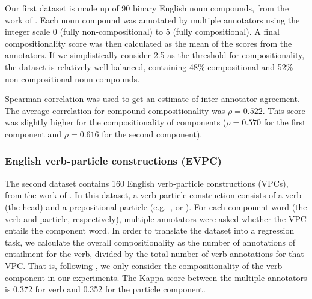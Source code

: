 \documentclass[output=paper
,modfonts
,nonflat]{langsci/langscibook}
\begin{document}
Our first dataset is made up of 90 binary English noun compounds, from
the work of \citet{reddy2011a}. Each noun compound was annotated by
multiple annotators using the integer scale 0 (fully
non-compositional) to 5 (fully compositional). A final
compositionality score was then calculated as the mean of the scores
from the annotators. If we simplistically consider 2.5 as the
threshold for compositionality, the dataset is relatively well
balanced, containing 48\% compositional and 52\% non-compositional
noun compounds. 

Spearman correlation was used to get an estimate of inter-annotator
agreement.  The average correlation for compound compositionality was
$\rho = 0.522$. This score was slightly higher for the compositionality of
components ($\rho = 0.570$ for the first component and $\rho = 0.616$ for the second
component).




\subsubsection{English verb-particle constructions (EVPC)}
\label{sec:evpc}

The second dataset contains 160 English verb-particle constructions
(VPCs), from the work of \citet{bannard2006}. In this dataset, a 
verb-particle construction consists of a verb (the head) and a
prepositional particle (e.g.\ ,  or
). For each component word (the verb and particle,
respectively), multiple annotators were asked whether the VPC entails
the component word. In order to translate the dataset into a
regression task, we calculate the overall compositionality as the
number of annotations of entailment for the verb, divided by the total
number of verb annotations for that VPC. That is, following
\citet{bannard2003}, we only consider the compositionality of the verb
component in our experiments.
The Kappa score between the multiple annotators is 0.372 for verb and
0.352 for the particle component.
 

\end{document}

